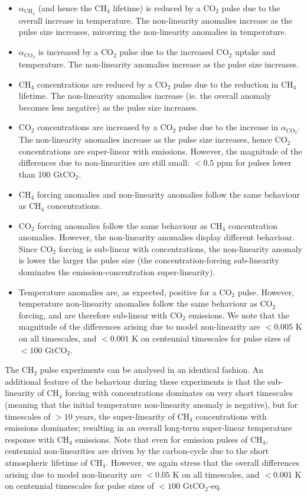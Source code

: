 \documentclass[gmd, manuscript]{copernicus}
\begin{document}
\begin{itemize}
\item $\alpha_{\text{CH}_4}$ (and hence the CH$_4$ lifetime) is reduced by a CO$_2$ pulse due to the overall increase in temperature. The non-linearity anomalies increase as the pulse size increases, mirorring the non-linearity anomalies in temperature.
\item  $\alpha_{\text{CO}_2}$ is increased by a CO$_2$ pulse due to the increased CO$_2$ uptake and temperature. The non-linearity anomalies increase as the pulse size increases.
\item  CH$_4$ concentrations are reduced by a CO$_2$ pulse due to the reduction in CH$_4$ lifetime. The non-linearity anomalies increase (ie. the overall anomaly becomes less negative) as the pulse size increases.
\item  CO$_2$ concentrations are increased by a CO$_2$ pulse due to the increase in $\alpha_{\text{CO}_2}$. The non-linearity anomalies increase as the pulse size increases, hence CO$_2$ concentrations are super-linear with emissions. However, the magnitude of the differences due to non-linearities are still small: $<0.5$ ppm for pulses lower than 100 GtCO$_2$.
\item  CH$_4$ forcing anomalies and non-linearity anomalies follow the same behaviour as CH$_4$ concentrations.
\item  CO$_2$ forcing anomalies follow the same behaviour as CH$_4$ concentration anomalies. However, the non-linearity anomalies display different behaviour. Since CO$_2$ forcing is sub-linear with concentrations, the non-linearity anomaly is lower the larger the pulse size (the concentration-forcing sub-linearity dominates the emission-concentration super-linearity).
\item  Temperature anomalies are, as expected, positive for a CO$_2$ pulse. However, temperature non-linearity anomalies follow the same behaviour as CO$_2$ forcing, and are therefore sub-linear with CO$_2$ emissions. We note that the magnitude of the differences arising due to model non-linearity are $<0.005$ K on all timescales, and $<0.001$ K on centennial timescales for pulse sizes of $<100$ GtCO$_2$.
\end{itemize}
The CH$_2$ pulse experiments can be analysed in an identical fashion. An additional feature of the behaviour during these experiments is that the sub-linearity of CH$_4$ forcing with concentrations dominates on very short timescales (meaning that the initial temperature non-linearity anomaly is negative), but for timescales of $> 10$ years, the super-linearity of CH$_4$ concentrations with emissions dominates; resulting in an overall long-term super-linear temperature response with CH$_4$ emissions. Note that even for emission pulses of CH$_4$, centennial non-linearities are driven by the carbon-cycle due to the short atmospheric lifetime of CH$_4$. However, we again stress that the overall differences arising due to model non-linearity are $<0.05$ K on all timescales, and $<0.001$ K on centennial timescales for pulse sizes of $<100$ GtCO$_2$-eq.\\
\end{document}
